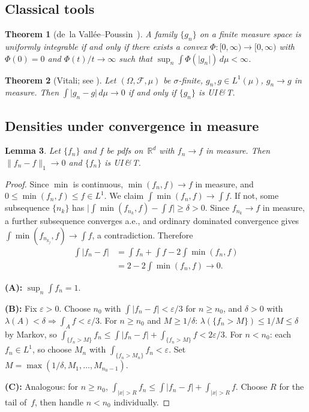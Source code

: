 \documentclass[journal]{IEEEtran}
\newtheorem{theorem}{Theorem}
\newtheorem{lemma}[theorem]{Lemma}
\theoremstyle{definition}
\theoremstyle{remark}
\newcommand{\Rd}{\mathbb{R}^d}
\newcommand{\1}{\mathbf{1}}
\newcommand{\abs}[1]{\lvert #1 \rvert}
\newcommand{\norm}[1]{\lVert #1 \rVert}
\begin{document}
\subsection{Classical tools}

\begin{theorem}[de~la Vall\'{e}e--Poussin~\cite{delaValleePoussin1915}]
  \label{thm:dVP}
A family $\{g_n\}$ on a finite measure space is uniformly integrable
if and only if there exists a convex $\Phi : [0,\infty) \to [0,\infty)$
with $\Phi(0) = 0$ and $\Phi(t)/t \to \infty$ such that
$\sup_n \int \Phi(\abs{g_n}) \, d\mu < \infty$.
\end{theorem}

\begin{theorem}[Vitali; see {\cite[Thm.~4.5.4]{Folland1999}}]
  \label{thm:Vitali}
Let $(\Omega, \mathcal{F}, \mu)$ be $\sigma$-finite,
$g_n, g \in L^1(\mu)$, $g_n \to g$ in measure.  Then
$\int \abs{g_n - g} \, d\mu \to 0$ if and only if $\{g_n\}$ is
UI\,\&\,T.
\end{theorem}

\subsection{Densities under convergence in measure}

\begin{lemma}\label{lem:density-UIT}
Let $\{f_n\}$ and $f$ be pdfs on~$\Rd$ with $f_n \to f$ in measure.
Then $\norm{f_n - f}_1 \to 0$ and $\{f_n\}$ is UI\,\&\,T.
\end{lemma}

\begin{proof}
Since $\min$ is continuous, $\min(f_n, f) \to f$ in measure,
and $0 \leq \min(f_n, f) \leq f \in L^1$.  We claim
$\int \min(f_n, f) \to \int f$.  If not, some subsequence
$\{n_k\}$ has $\abs{\int \min(f_{n_k}, f) - \int f} \geq \delta
> 0$.  Since $f_{n_k} \to f$ in measure, a further subsequence
converges a.e., and ordinary dominated convergence gives
$\int \min(f_{n_{k_j}}, f) \to \int f$, a contradiction.
Therefore
\begin{align*}
  \int \abs{f_n - f}
  &= \int f_n + \int f - 2\int \min(f_n, f) \\
  &= 2 - 2\int \min(f_n, f) \to 0.
\end{align*}

\medskip\noindent
\textbf{(A):}\; $\sup_n \int f_n = 1$.

\medskip\noindent
\textbf{(B):}\; Fix $\varepsilon > 0$.  Choose $n_0$ with
$\int \abs{f_n - f} < \varepsilon/3$ for $n \geq n_0$, and
$\delta > 0$ with $\lambda(A) < \delta \Rightarrow
\int_A f < \varepsilon/3$.  For $n \geq n_0$ and $M \geq 1/\delta$:
$\lambda(\{f_n > M\}) \leq 1/M \leq \delta$ by Markov, so
$\int_{\{f_n > M\}} f_n
\leq \int \abs{f_n - f} + \int_{\{f_n > M\}} f
< 2\varepsilon/3$.
For $n < n_0$: each $f_n \in L^1$, so choose $M_n$ with
$\int_{\{f_n > M_n\}} f_n < \varepsilon$.  Set
$M = \max(1/\delta, M_1, \ldots, M_{n_0-1})$.

\medskip\noindent
\textbf{(C):}\; Analogous: for $n \geq n_0$,
$\int_{\abs{x}>R} f_n
\leq \int \abs{f_n - f} + \int_{\abs{x}>R} f$.
Choose $R$ for the tail of~$f$, then handle $n < n_0$ individually.
\end{proof}
\end{document}
